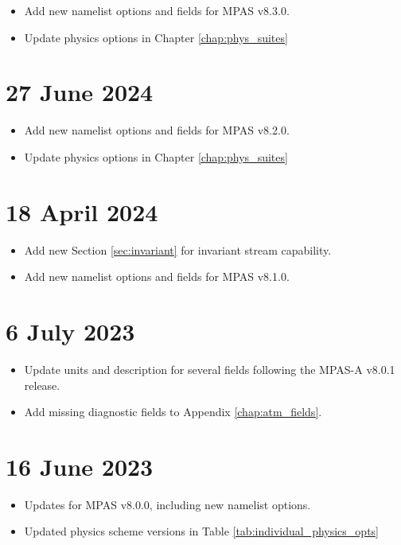 \begin{itemize}
\item Add new namelist options and fields for MPAS v8.3.0.
\item Update physics options in Chapter \ref{chap:phys_suites}
\end{itemize}

\section*{27 June 2024}

\begin{itemize}
\item Add new namelist options and fields for MPAS v8.2.0.
\item Update physics options in Chapter \ref{chap:phys_suites}
\end{itemize}

\section*{18 April 2024}

\begin{itemize}
\item Add new Section \ref{sec:invariant} for invariant stream capability.
\item Add new namelist options and fields for MPAS v8.1.0.
\end{itemize}

\section*{6 July 2023}

\begin{itemize}
\item Update units and description for several fields following the MPAS-A v8.0.1 release.
\item Add missing diagnostic fields to Appendix \ref{chap:atm_fields}.
\end{itemize}

\section*{16 June 2023}

\begin{itemize}
\item Updates for MPAS v8.0.0, including new namelist options.
\item Updated physics scheme versions in Table \ref{tab:individual_physics_opts}
\end{itemize}


